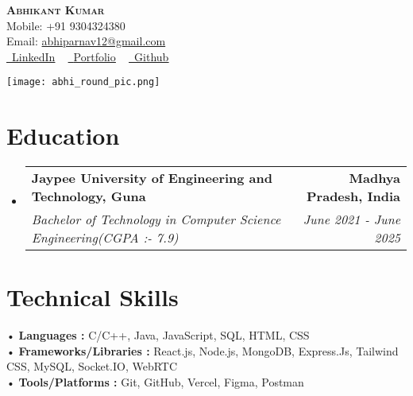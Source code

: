 \documentclass[letterpaper,11pt]{article}
\makeatletter
\newcommand{\resumeSubheading}[4]{
  \vspace{-2pt}\item
	\begin{tabular*}{1.0\textwidth}[t]{l@{\extracolsep{\fill}}r}
  	\textbf{#1} & \textbf{\small #2} \\
  	\textit{\small#3} & \textit{\small #4} \\
	\end{tabular*}\vspace{-7pt}
}
\newcommand{\resumeSubHeadingListStart}{\begin{itemize}[leftmargin=0.0in, label={}]}
\newcommand{\resumeSubHeadingListEnd}{\end{itemize}}
\makeatother
\begin{document}
\begin{minipage}[c]{0.4\textwidth}
    {\textbf{\Huge \scshape {Abhikant Kumar}}} \\ \vspace{2pt} 
    {Mobile: +91 9304324380}  \\ \vspace{1pt} 
    {Email: \href{mailto:x@gmail.com}{abhiparnav12@gmail.com}}  \\ \vspace{1pt} 
    {\href{https://linkedin.com/in//}{\raisebox{-0.2\height}\faLinkedin\ \underline{LinkedIn}} ~
    \href{https://abhikant-portfolio.netlify.app/}{\raisebox{-0.2\height}\faGlobe\ \underline{Portfolio}} ~ \href{https://github.com/abhikant12}{\raisebox{-0.2\height}\faGithub\ \underline{Github}}}    
\end{minipage}
\hfill
\begin{minipage}[c]{0.52\textwidth}
\begin{flushright}
    \texttt{[image: abhi\_round\_pic.png]}
\end{flushright}
\end{minipage}
\vspace{-13pt}

 
\section{Education}
\begin{itemize}[leftmargin=0.12in, label={}]
  \vspace{-9pt}
  \resumeSubHeadingListStart
	\resumeSubheading
  	{Jaypee University of Engineering and Technology, Guna}{Madhya Pradesh, India}
  	{Bachelor of Technology in Computer Science Engineering(CGPA  :-  7.9)}{June 2021 - June 2025}
   \vspace{-2pt}
  \resumeSubHeadingListEnd
\end{itemize} 



\section{Technical Skills }
 \begin{itemize}[leftmargin=0.12in, label={}]
        \vspace{-2pt}
	\small{\item{
 	\hspace{-5pt}• \textbf{Languages : }{ C/C++, Java, JavaScript, SQL, HTML, CSS } \\  \vspace{3pt}
        \hspace{-5pt}• \textbf{Frameworks/Libraries :}  {React.js, Node.js, MongoDB, Express.Js, Tailwind CSS,  MySQL, Socket.IO, WebRTC   } \\  \vspace{3pt}
        \hspace{-5pt}• \textbf{Tools/Platforms :}  {Git, GitHub, Vercel, Figma, Postman} \\
	}}
 \end{itemize}
 \vspace{-14pt}
\end{document}
